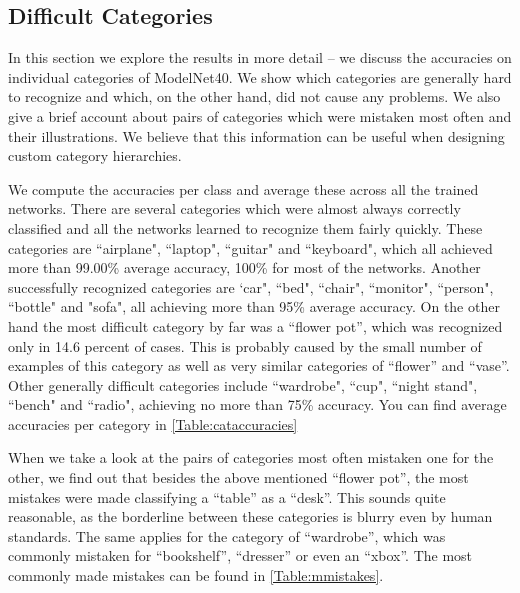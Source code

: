 \subsection{Difficult Categories}
In this section we explore the results in more detail -- we discuss the accuracies on individual categories of ModelNet40. We show which categories are generally hard to recognize and which, on the other hand, did not cause any problems. We also give a brief account about pairs of categories which were mistaken most often and their illustrations. We believe that this information can be useful when designing custom category hierarchies. \par
We compute the accuracies per class and average these across all the trained networks. There are several categories which were almost always correctly classified and all the networks learned to recognize them fairly quickly. These categories are ``airplane", ``laptop", ``guitar" and ``keyboard", which all achieved more than 99.00\% average accuracy, 100\% for most of the networks. Another successfully recognized categories are `car", ``bed", ``chair", ``monitor", ``person", ``bottle" and "sofa", all achieving more than 95\% average accuracy.  
On the other hand the most difficult category by far was a ``flower pot”, which was recognized only in 14.6 percent of cases. This is probably caused by the small number of examples of this category as well as very similar categories of ``flower” and ``vase”. Other generally difficult categories include ``wardrobe", ``cup", ``night stand", ``bench" and ``radio", achieving no more than 75\% accuracy. You can find average accuracies per category in \autoref{Table:cataccuracies} \par



When we take a look at the pairs of categories most often mistaken one for the other, we find out that besides the above mentioned “flower pot”, the most mistakes were made classifying a “table” as a “desk”. This sounds quite reasonable, as the borderline between these categories is blurry even by human standards. The same applies for the category of “wardrobe”, which was commonly mistaken for “bookshelf”, “dresser” or even an “xbox”. The most commonly made mistakes can be found in \autoref{Table:mmistakes}.




